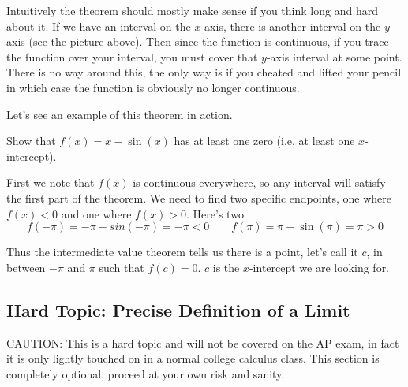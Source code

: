 Intuitively the theorem should mostly make sense if you think long and hard about it. If we have an interval on the $x$-axis, there is another interval on the $y$-axis (see the picture above). Then since the function is continuous, if you trace the function over your interval, you must cover that $y$-axis interval at some point. There is no way around this, the only way is if you cheated and lifted your pencil in which case the function is obviously no longer continuous.

Let's see an example of this theorem in action.
\begin{example}
	Show that $f(x) = x - \sin(x)$ has at least one zero (i.e. at least one $x$-intercept). 
	
	First we note that $f(x)$ is continuous everywhere, so any interval will satisfy the first part of the theorem. We need to find two specific endpoints, one where $f(x) < 0$ and one where $f(x) > 0$. Here's two
	\[ f(-\pi) = -\pi - sin(-\pi) = -\pi < 0 \qquad f(\pi) = \pi - \sin(\pi) = \pi > 0 \]
	
	Thus the intermediate value theorem tells us there is a point, let's call it $c$, in between $-\pi$ and $\pi$ such that $f(c) = 0$. $c$ is the $x$-intercept we are looking for.
\end{example}

\newpage 
\subsection{Hard Topic: Precise Definition of a Limit}
\bigskip
\begin{mdframed}[linewidth=1pt]
CAUTION: This is a hard topic and will not be covered on the AP exam, in fact it is only lightly touched on in a normal college calculus class. This section is completely optional, proceed at your own risk and sanity.
\end{mdframed}



